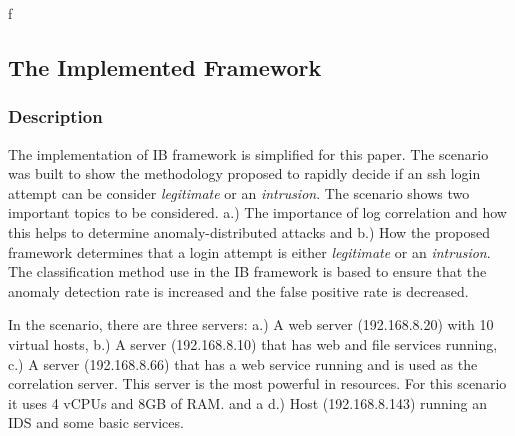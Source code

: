 \documentclass[conference]{IEEEtran}
\begin{document}

f%

\subsection{The Implemented Framework}

\subsubsection{Description}
The implementation of IB framework is simplified for this paper. The scenario was built to show the methodology proposed to rapidly decide if an ssh login attempt can be consider \emph{legitimate} or an  \emph{intrusion}. The scenario shows two important topics to be considered. a.) The importance of log correlation and how this helps to determine anomaly-distributed attacks and b.) How the proposed framework determines that a login attempt is either  \emph{legitimate} or an \emph{intrusion}. The classification method use in the IB framework is based to ensure that the anomaly detection rate is increased and the false positive rate is decreased.

In the scenario, there are three servers: a.) A web server (192.168.8.20) with 10 virtual hosts, b.) A server (192.168.8.10) that has web and file services running, c.) A server (192.168.8.66) that has a web service running and is used as the correlation server. This server is the most powerful in resources. For this scenario it uses 4 vCPUs and 8GB of RAM. and a d.) Host (192.168.8.143) running an IDS and some basic services.
\end{document}
